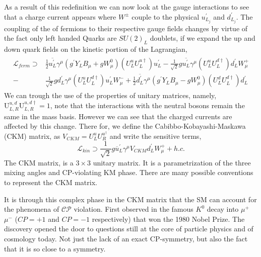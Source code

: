As a result of this redefinition we can now look at the gauge interactions to see that a charge current appears where $W^\pm$ couple to the physical $u^\prime_{L_j}$ and $d^\prime_{L_j}$. 
%
The coupling of the of fermions to their respective gauge fields changes by virtue of the fact only left handed Quarks are $SU(2)_L$ doublets, if we expand the up and down quark fields on the kinetic portion of the Lagrangian,
%
\begin{align}
\begin{split}
\mathcal{L}_{ferm} \supset & 
\frac{1}{2} \overline{u^\prime_L} \gamma^\mu \left( g^\prime Y_L B_\mu + g W^0_\mu  \right) \left(U^u_L U^{u \dagger}_L \right) u^\prime_L - \frac{1}{\sqrt{2}} g \overline{u^\prime_L} \gamma^\mu \left( U^u_L U^{d \dagger}_L \right) d^\prime_L W^+_\mu \\ \nonumber   
- 
& \frac{1}{\sqrt{2}} g d^\prime_L \gamma^\mu \left( U^u_L U^{d \dagger}_L \right) u^\prime_L W^-_\mu 
+ 
\frac{1}{2} \overline{d^\prime_L} \gamma^\mu \left( g^\prime Y_L B_\mu - g W^0_\mu \right) \left( U^d_L U^{d \dagger}_L \right) d^\prime_L  
\end{split}
\end{align}
%
We can trough the use of the properties of unitary matrices, namely, $ \mathrm{U}^{u,d}_{L,R} \mathrm{U}^{u,d \dagger}_{L,R} = 1$, note that the interactions with the neutral bosons remain the same in the mass basis. However we can see that the charged currents are affected by this change.
%
There for, we define the Cabibbo-Kobayashi-Maskawa (CKM) matrix, as $V_{CKM} = U^u_L U^{u ^\dagger }_R $ and write the sensitive terms,
%
\begin{equation}
\mathcal{L}_{kin} \supset \frac{1}{\sqrt{2}} g \overline{u}^\prime_L \gamma^\mu V_{CKM} d_L^\prime W^+_\mu + h.c. 
\end{equation}
%
The CKM matrix, is a $3 \times 3$ unitary matrix. It is a parametrization of the three mixing angles and CP-violating KM phase. There are many possible conventions to represent the CKM matrix. 

It is through this complex phase in the CKM matrix that the SM can account for the phenomena of $\mathcal{CP}$ violation. First observed in the famous $K^0$ decay into $\mu^+$ $\mu^-$ ($CP=+1$ and $CP=-1$ respectively) that won the 1980 Nobel Prize. The discovery opened the door to questions still at the core of particle physics and of cosmology today. Not just the lack of an exact CP-symmetry, but also the fact that it is so close to a symmetry. 


